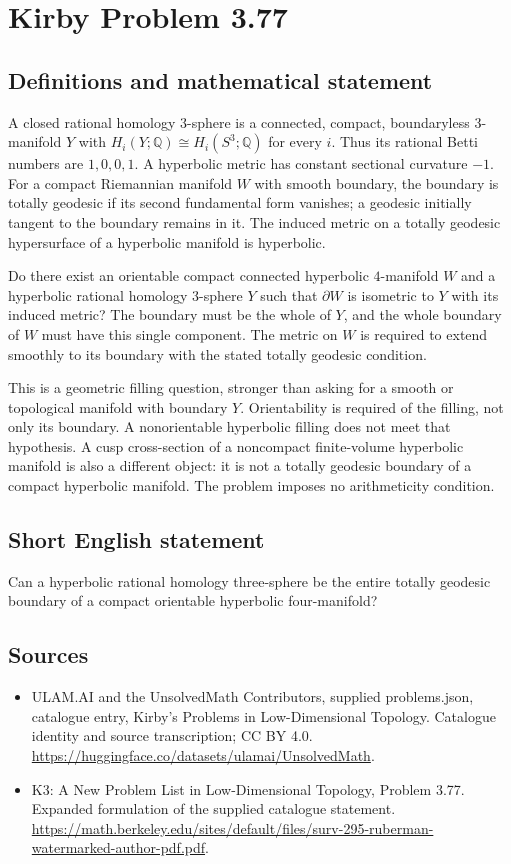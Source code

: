 \documentclass[11pt,a4paper]{article}
\begin{document}
\section*{Kirby Problem 3.77}\label{statement}

\subsection{Definitions and mathematical statement}
A closed rational homology $3$-sphere is a connected, compact, boundaryless
$3$-manifold $Y$ with $H_i(Y;\mathbb Q)\cong H_i(S^3;\mathbb Q)$ for every
$i$. Thus its rational Betti numbers are $1,0,0,1$.
A hyperbolic metric has constant sectional curvature $-1$.
For a compact Riemannian manifold $W$ with smooth boundary, the boundary
is totally geodesic if its second fundamental form vanishes; a geodesic
initially tangent to the boundary remains in it. The induced metric on
a totally geodesic hypersurface of a hyperbolic manifold is hyperbolic.

Do there exist an orientable compact connected hyperbolic $4$-manifold
$W$ and a hyperbolic rational homology $3$-sphere $Y$ such that
$\partial W$ is isometric to $Y$ with its induced metric? The boundary
must be the whole of $Y$, and the whole boundary of $W$ must have this
single component. The metric on $W$ is required to extend smoothly to
its boundary with the stated totally geodesic condition.

This is a geometric filling question, stronger than asking for a
smooth or topological manifold with boundary $Y$. Orientability is
required of the filling, not only its boundary. A nonorientable
hyperbolic filling does not meet that hypothesis. A cusp cross-section
of a noncompact finite-volume hyperbolic manifold is also a different
object: it is not a totally geodesic boundary of a compact hyperbolic
manifold. The problem imposes no arithmeticity condition.
\subsection{Short English statement}
Can a hyperbolic rational homology three-sphere be the entire totally geodesic boundary of a compact orientable hyperbolic four-manifold?
\subsection{Sources}
\begin{itemize}
\item[S1] ULAM.AI and the UnsolvedMath Contributors, supplied problems.json, catalogue entry, Kirby's Problems in Low-Dimensional Topology. Catalogue identity and source transcription; CC BY 4.0.
\url{https://huggingface.co/datasets/ulamai/UnsolvedMath}.
\item[S2] K3: A New Problem List in Low-Dimensional Topology, Problem 3.77. Expanded formulation of the supplied catalogue statement.
\url{https://math.berkeley.edu/sites/default/files/surv-295-ruberman-watermarked-author-pdf.pdf}.
\end{itemize}
\end{document}
